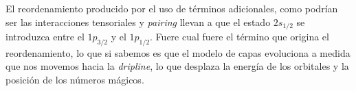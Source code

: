 El reordenamiento producido por el uso de términos adicionales, como podrían ser las interacciones tensoriales y \textit{pairing} \cite{tanihata2023tensor} llevan a que el estado $2s_{1/2}$ se introduzca entre el $1p_{3/2}$  y el $1p_{1/2}$. Fuere cual fuere el término que origina el reordenamiento, lo que si sabemos es que el modelo de capas evoluciona a medida que nos movemos hacia la \textit{dripline}, lo que desplaza la energía de los orbitales y la posición de los números mágicos.


